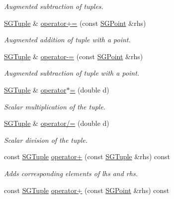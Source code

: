 \begin{DoxyCompactItemize}
\begin{DoxyCompactList}\small\item\em Augmented subtraction of tuples. \end{DoxyCompactList}\item 
\hyperlink{classSGTuple}{S\-G\-Tuple} \& \hyperlink{classSGTuple_af3e77720996ec599cdffea08f92355ae}{operator+=} (const \hyperlink{classSGPoint}{S\-G\-Point} \&rhs)
\begin{DoxyCompactList}\small\item\em Augmented addition of tuple with a point. \end{DoxyCompactList}\item 
\hyperlink{classSGTuple}{S\-G\-Tuple} \& \hyperlink{classSGTuple_a2e6d730692fe4e702e021044dd9889a8}{operator-\/=} (const \hyperlink{classSGPoint}{S\-G\-Point} \&rhs)
\begin{DoxyCompactList}\small\item\em Augmented subtraction of tuple with a point. \end{DoxyCompactList}\item 
\hypertarget{classSGTuple_a26a157fe2e19fef59e17e58d1c0e99c1}{\hyperlink{classSGTuple}{S\-G\-Tuple} \& \hyperlink{classSGTuple_a26a157fe2e19fef59e17e58d1c0e99c1}{operator$\ast$=} (double d)}\label{classSGTuple_a26a157fe2e19fef59e17e58d1c0e99c1}

\begin{DoxyCompactList}\small\item\em Scalar multiplication of the tuple. \end{DoxyCompactList}\item 
\hypertarget{classSGTuple_a63277a0693207afb1ddbc048df29534a}{\hyperlink{classSGTuple}{S\-G\-Tuple} \& \hyperlink{classSGTuple_a63277a0693207afb1ddbc048df29534a}{operator/=} (double d)}\label{classSGTuple_a63277a0693207afb1ddbc048df29534a}

\begin{DoxyCompactList}\small\item\em Scalar division of the tuple. \end{DoxyCompactList}\item 
\hypertarget{classSGTuple_af1be38e7c5ab70d302219e54dc4867ad}{const \hyperlink{classSGTuple}{S\-G\-Tuple} \hyperlink{classSGTuple_af1be38e7c5ab70d302219e54dc4867ad}{operator+} (const \hyperlink{classSGTuple}{S\-G\-Tuple} \&rhs) const }\label{classSGTuple_af1be38e7c5ab70d302219e54dc4867ad}

\begin{DoxyCompactList}\small\item\em Adds corresponding elements of lhs and rhs. \end{DoxyCompactList}\item 
\hypertarget{classSGTuple_a02cd55b18d08d67dbc0bf26531b68818}{const \hyperlink{classSGTuple}{S\-G\-Tuple} \hyperlink{classSGTuple_a02cd55b18d08d67dbc0bf26531b68818}{operator+} (const \hyperlink{classSGPoint}{S\-G\-Point} \&rhs) const }\label{classSGTuple_a02cd55b18d08d67dbc0bf26531b68818}


\end{DoxyCompactItemize}
